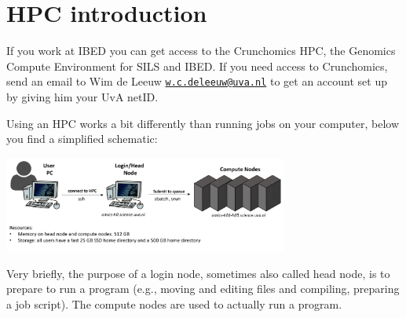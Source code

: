 \documentclass[
  letterpaper,
  DIV=11,
  numbers=noendperiod]{scrreprt}
\author{}
\date{}
\renewcommand*\contentsname{Table of contents}
\newcommand\contentsname{Table of contents}
\begin{document}

\renewcommand*\contentsname{Table of contents}
{
\hypersetup{linkcolor=}
\setcounter{tocdepth}{1}
\tableofcontents
}
\section{HPC introduction}\label{hpc-introduction}

If you work at IBED you can get access to the Crunchomics HPC, the
Genomics Compute Environment for SILS and IBED. If you need access to
Crunchomics, send an email to Wim de Leeuw
\href{mailto:w.c.deleeuw@uva.nl}{\nolinkurl{w.c.deleeuw@uva.nl}} to get
an account set up by giving him your UvA netID.

Using an HPC works a bit differently than running jobs on your computer,
below you find a simplified schematic:

\begin{center}
\includegraphics[width=0.7\textwidth,height=\textheight]{../img/crunchomics1.png}
\end{center}

Very briefly, the purpose of a login node, sometimes also called head
node, is to prepare to run a program (e.g., moving and editing files and
compiling, preparing a job script). The compute nodes are used to
actually run a program.
\end{document}
